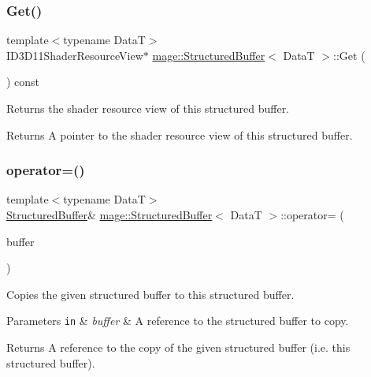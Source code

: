 \subsubsection{\texorpdfstring{Get()}{Get()}}
{\footnotesize\ttfamily template$<$typename DataT$>$ \\
I\+D3\+D11\+Shader\+Resource\+View$\ast$ \hyperlink{classmage_1_1_structured_buffer}{mage\+::\+Structured\+Buffer}$<$ DataT $>$\+::Get (\begin{DoxyParamCaption}{ }\end{DoxyParamCaption}) const\hspace{0.3cm}{\ttfamily [noexcept]}}

Returns the shader resource view of this structured buffer.

\begin{DoxyReturn}{Returns}
A pointer to the shader resource view of this structured buffer. 
\end{DoxyReturn}
\hypertarget{classmage_1_1_structured_buffer_ac00255155ab1eb61244392adcf262d40}{}\label{classmage_1_1_structured_buffer_ac00255155ab1eb61244392adcf262d40} 
\subsubsection{\texorpdfstring{operator=()}{operator=()}\hspace{0.1cm}{\footnotesize\ttfamily [1/2]}}
{\footnotesize\ttfamily template$<$typename DataT$>$ \\
\hyperlink{classmage_1_1_structured_buffer}{Structured\+Buffer}\& \hyperlink{classmage_1_1_structured_buffer}{mage\+::\+Structured\+Buffer}$<$ DataT $>$\+::operator= (\begin{DoxyParamCaption}\item[{const \hyperlink{classmage_1_1_structured_buffer}{Structured\+Buffer}$<$ DataT $>$ \&}]{buffer }\end{DoxyParamCaption})\hspace{0.3cm}{\ttfamily [delete]}}

Copies the given structured buffer to this structured buffer.


\begin{DoxyParams}[1]{Parameters}
\mbox{\tt in}  & {\em buffer} & A reference to the structured buffer to copy. \\
\hline
\end{DoxyParams}
\begin{DoxyReturn}{Returns}
A reference to the copy of the given structured buffer (i.\+e. this structured buffer). 
\end{DoxyReturn}
\hypertarget{classmage_1_1_structured_buffer_a2647510e153d15b89f860e2a5c68e231}{}\label{classmage_1_1_structured_buffer_a2647510e153d15b89f860e2a5c68e231} 
